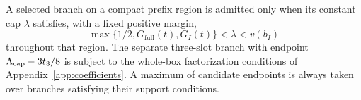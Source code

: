 A selected branch on a compact prefix region is admitted only when
its constant cap $\lambda$ satisfies, with a fixed positive margin,
\begin{equation}\label{sv:branch-licence}
 \max\{1/2,G_{\mathrm{full}}(t),G_I(t)\}
       <\lambda<v(b_I)
\end{equation}
throughout that region.  The separate three-slot branch with endpoint
$\Lambda_{\rm cap}-3t_3/8$ is subject to the whole-box factorization conditions
of Appendix~\ref{app:coefficients}.  A maximum of candidate endpoints
is always taken over branches satisfying their support conditions.
